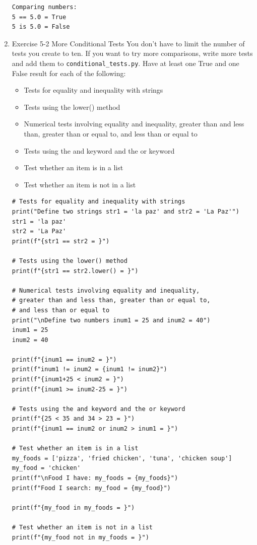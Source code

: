 \documentclass[10pt]{book}
\begin{document}
\begin{enumerate}
\begin{verbatim}
Comparing numbers:
5 == 5.0 = True
5 is 5.0 = False
\end{verbatim}
\item Exercise 5-2 More Conditional Tests
\label{sec:orgde9336e}
You don’t have to limit the number of tests you create to ten. If you want to try more comparisons, write more tests and add them to \texttt{conditional\_tests.py}. Have at least one True and one False result for each of the following: 
\begin{itemize}
\item Tests for equality and inequality with strings
\item Tests using the lower() method
\item Numerical tests involving equality and inequality, greater than and less than, greater than or equal to, and less than or equal to
\item Tests using the and keyword and the or keyword
\item Test whether an item is in a list
\item Test whether an item is not in a list
\end{itemize}
\begin{verbatim}
# Tests for equality and inequality with strings
print("Define two strings str1 = 'la paz' and str2 = 'La Paz'")
str1 = 'la paz'
str2 = 'La Paz'
print(f"{str1 == str2 = }")

# Tests using the lower() method
print(f"{str1 == str2.lower() = }")

# Numerical tests involving equality and inequality,
# greater than and less than, greater than or equal to,
# and less than or equal to
print("\nDefine two numbers inum1 = 25 and inum2 = 40")
inum1 = 25
inum2 = 40

print(f"{inum1 == inum2 = }")
print(f"inum1 != inum2 = {inum1 != inum2}")
print(f"{inum1+25 < inum2 = }")
print(f"{inum1 >= inum2-25 = }")

# Tests using the and keyword and the or keyword
print(f"{25 < 35 and 34 > 23 = }")
print(f"{inum1 == inum2 or inum2 > inum1 = }")

# Test whether an item is in a list
my_foods = ['pizza', 'fried chicken', 'tuna', 'chicken soup']
my_food = 'chicken'
print(f"\nFood I have: my_foods = {my_foods}")
print(f"Food I search: my_food = {my_food}")

print(f"{my_food in my_foods = }")

# Test whether an item is not in a list
print(f"{my_food not in my_foods = }")
\end{verbatim}


\end{enumerate}
\end{document}

